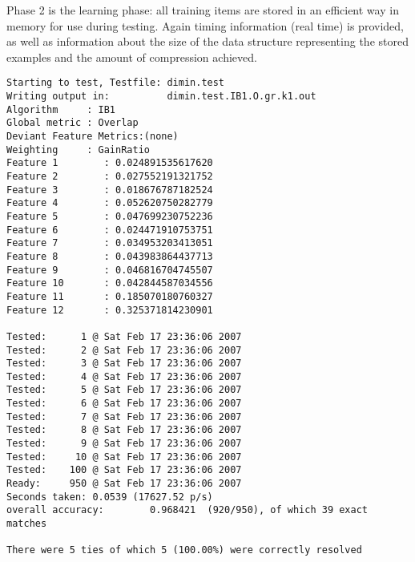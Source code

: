 \documentclass{report}
\begin{document}


Phase 2 is the learning phase: all training items are stored in an
efficient way in memory for use during testing. Again timing
information (real time) is provided, as well as information about the
size of the data structure representing the stored examples and the
amount of compression achieved. 



{\footnotesize
\begin{verbatim}
Starting to test, Testfile: dimin.test
Writing output in:          dimin.test.IB1.O.gr.k1.out
Algorithm     : IB1
Global metric : Overlap
Deviant Feature Metrics:(none)
Weighting     : GainRatio
Feature 1        : 0.024891535617620
Feature 2        : 0.027552191321752
Feature 3        : 0.018676787182524
Feature 4        : 0.052620750282779
Feature 5        : 0.047699230752236
Feature 6        : 0.024471910753751
Feature 7        : 0.034953203413051
Feature 8        : 0.043983864437713
Feature 9        : 0.046816704745507
Feature 10       : 0.042844587034556
Feature 11       : 0.185070180760327
Feature 12       : 0.325371814230901

Tested:      1 @ Sat Feb 17 23:36:06 2007
Tested:      2 @ Sat Feb 17 23:36:06 2007
Tested:      3 @ Sat Feb 17 23:36:06 2007
Tested:      4 @ Sat Feb 17 23:36:06 2007
Tested:      5 @ Sat Feb 17 23:36:06 2007
Tested:      6 @ Sat Feb 17 23:36:06 2007
Tested:      7 @ Sat Feb 17 23:36:06 2007
Tested:      8 @ Sat Feb 17 23:36:06 2007
Tested:      9 @ Sat Feb 17 23:36:06 2007
Tested:     10 @ Sat Feb 17 23:36:06 2007
Tested:    100 @ Sat Feb 17 23:36:06 2007
Ready:     950 @ Sat Feb 17 23:36:06 2007
Seconds taken: 0.0539 (17627.52 p/s)
overall accuracy:        0.968421  (920/950), of which 39 exact matches 

There were 5 ties of which 5 (100.00%) were correctly resolved
\end{verbatim}
}


\end{document}
